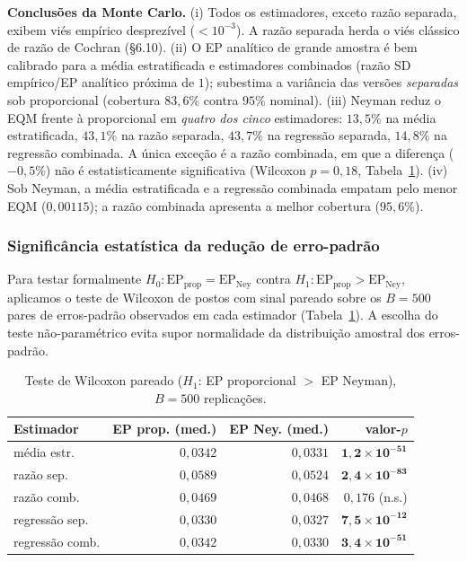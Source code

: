 \textbf{Conclusões da Monte Carlo.} (i) Todos os estimadores, exceto razão
separada, exibem viés empírico desprezível (\(<10^{-3}\)). A razão separada
herda o viés clássico de razão de Cochran (\S6.10). (ii) O EP analítico de
grande amostra é bem calibrado para a média estratificada e estimadores
combinados (razão SD empírico/EP analítico próxima de $1$); subestima a
variância das versões \textit{separadas} sob proporcional (cobertura
$83{,}6\%$ contra $95\%$ nominal). (iii) Neyman reduz o EQM frente à
proporcional em \emph{quatro dos cinco} estimadores: $13{,}5\%$ na média
estratificada, $43{,}1\%$ na razão separada, $43{,}7\%$ na regressão
separada, $14{,}8\%$ na regressão combinada. A única exceção é a razão
combinada, em que a diferença ($-0{,}5\%$) não é estatisticamente significativa
(Wilcoxon $p=0{,}18$, Tabela~\ref{tab:wilcoxon}). (iv) Sob Neyman, a média
estratificada e a regressão combinada empatam pelo menor EQM ($0{,}00115$); a
razão combinada apresenta a melhor cobertura ($95{,}6\%$).

\subsubsection*{Significância estatística da redução de erro-padrão}

Para testar formalmente $H_0: \mathrm{EP}_{\mathrm{prop}} = \mathrm{EP}_{\mathrm{Ney}}$
contra $H_1: \mathrm{EP}_{\mathrm{prop}} > \mathrm{EP}_{\mathrm{Ney}}$,
aplicamos o teste de Wilcoxon de postos com sinal pareado sobre os $B=500$
pares de erros-padrão observados em cada estimador
(Tabela~\ref{tab:wilcoxon}). A escolha do teste não-paramétrico evita supor
normalidade da distribuição amostral dos erros-padrão.

\begin{table}[!t]
\centering
\small
\setlength{\tabcolsep}{3pt}
\caption{Teste de Wilcoxon pareado ($H_1$: EP proporcional $>$ EP Neyman),
$B=500$ replicações.}
\label{tab:wilcoxon}
\begin{tabular}{lrrr}
\toprule
Estimador & EP prop. (med.) & EP Ney. (med.) & valor-$p$ \\
\midrule
média estr.       & $0{,}0342$ & $0{,}0331$ & $\mathbf{1{,}2 \times 10^{-51}}$ \\
razão sep.        & $0{,}0589$ & $0{,}0524$ & $\mathbf{2{,}4 \times 10^{-83}}$ \\
razão comb.       & $0{,}0469$ & $0{,}0468$ & $0{,}176$ (n.s.) \\
regressão sep.    & $0{,}0330$ & $0{,}0327$ & $\mathbf{7{,}5 \times 10^{-12}}$ \\
regressão comb.   & $0{,}0342$ & $0{,}0330$ & $\mathbf{3{,}4 \times 10^{-51}}$ \\
\bottomrule
\end{tabular}
\end{table}

